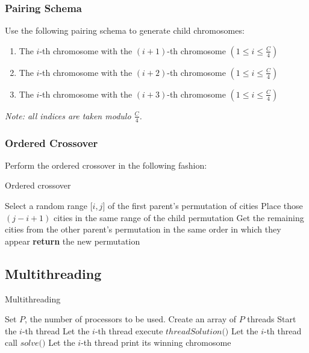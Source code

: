 \documentclass[twoside,twocolumn]{article}
\begin{document}
  \subsubsection{Pairing Schema}
  
  Use the following pairing schema to generate child chromosomes:
  
  \begin{enumerate}
  \item The $i$-th chromosome with the $(i + 1)$-th chromosome $\left(1\leq i \leq \frac{C}{4}\right)$
  \item The $i$-th chromosome with the $(i + 2)$-th chromosome $\left(1\leq i \leq \frac{C}{4}\right)$
  \item The $i$-th chromosome with the $(i + 3)$-th chromosome $\left(1\leq i \leq \frac{C}{4}\right)$
  \end{enumerate} 
  
  \textit{Note: all indices are taken modulo $\frac{C}{4}$.}
  
  \subsubsection{Ordered Crossover}
  
  Perform the ordered crossover in the following fashion:
  
  \begin{algorithm}
          \caption{Ordered crossover}\label{oc}
          {\fontsize{6}{6}\selectfont \begin{algorithmic}[1]
              \State Select a random range $\big[i, j\big]$ of the first parent's permutation of cities
              \State Place those $(j - i + 1)$ cities in the same range of the child permutation
              \State Get the remaining cities from the other parent’s permutation in the same order in which they appear
              \State \textbf{return} the new permutation
              \EndProcedure
          \end{algorithmic}}
  \end{algorithm}
  
  \subsection{Multithreading}
  
  \begin{algorithm}
          \caption{Multithreading}\label{oc}
          {\fontsize{7}{7}\selectfont \begin{algorithmic}[1]
              \State Set $P$, the number of processors to be used.
              \State Create an array of $P$ threads
                \State Start the $i$-th thread
                \State Let the $i$-th thread execute $threadSolution\big(\big)$ 
                \State Let the $i$-th thread call $solve\big(\big)$
                \State Let the $i$-th thread print its winning chromosome
              \EndFor
              \EndProcedure
          \end{algorithmic}}
  \end{algorithm}
  
\end{document}
